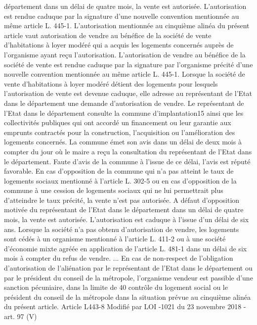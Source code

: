 \documentclass[11pt,a4paper]{report}
\begin{document}
	département dans un délai de quatre mois, la vente est autorisée. L'autorisation est rendue caduque par la
	signature d'une nouvelle convention mentionnée au même article L. 445-1.
	L'autorisation mentionnée au cinquième alinéa du présent article vaut autorisation de vendre au bénéfice de la
	société de vente d'habitations à loyer modéré qui a acquis les logements concernés auprès de l'organisme ayant
	reçu l'autorisation. L'autorisation de vendre au bénéfice de la société de vente est rendue caduque par la
	signature par l'organisme précité d'une nouvelle convention mentionnée au même article L. 445-1.
	Lorsque la société de vente d'habitations à loyer modéré détient des logements pour lesquels l'autorisation de
	vente est devenue caduque, elle adresse au représentant de l'Etat dans le département une demande
	d'autorisation de vendre. Le représentant de l'Etat dans le département consulte la commune d'implantation15
	ainsi que les collectivités publiques qui ont accordé un financement ou leur garantie aux emprunts contractés
	pour la construction, l'acquisition ou l'amélioration des logements concernés. La commune émet son avis dans
	un délai de deux mois à compter du jour où le maire a reçu la consultation du représentant de l'Etat dans le
	département. Faute d'avis de la commune à l'issue de ce délai, l'avis est réputé favorable. En cas d'opposition de
	la commune qui n'a pas atteint le taux de logements sociaux mentionné à l'article L. 302-5 ou en cas
	d'opposition de la commune à une cession de logements sociaux qui ne lui permettrait plus d'atteindre le taux
	précité, la vente n'est pas autorisée. A défaut d'opposition motivée du représentant de l'Etat dans le département
	dans un délai de quatre mois, la vente est autorisée. L'autorisation est caduque à l'issue d'un délai de six ans.
	Lorsque la société n'a pas obtenu d'autorisation de vendre, les logements sont cédés à un organisme mentionné
	à l'article L. 411-2 ou à une société d'économie mixte agréée en application de l'article L. 481-1 dans un délai
	de six mois à compter du refus de vendre.
	...
	En cas de non-respect de l'obligation d'autorisation de l'aliénation par le représentant de l'Etat dans le
	département ou par le président du conseil de la métropole, l'organisme vendeur est passible d'une sanction
	pécuniaire, dans la limite de 40 %
	contrôle du logement social ou le président du conseil de la métropole dans la situation prévue au cinquième
	alinéa du présent article.
	Article L443-8 Modifié par LOI -1021 du 23 novembre 2018 - art. 97 (V)
\end{document}
